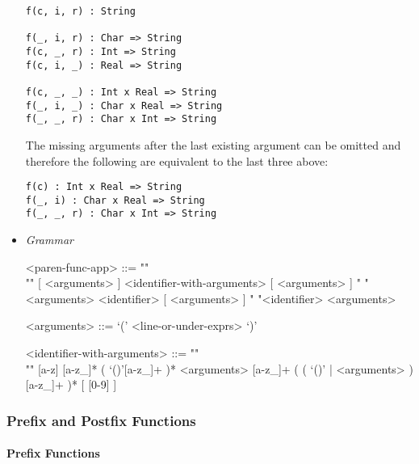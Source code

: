 \documentclass{article}
\begin{document}
\begin{itemize}
\begin{verbatim}
f(c, i, r) : String

f(_, i, r) : Char => String
f(c, _, r) : Int => String
f(c, i, _) : Real => String

f(c, _, _) : Int x Real => String
f(_, i, _) : Char x Real => String
f(_, _, r) : Char x Int => String
\end{verbatim}

The missing arguments after the last existing argument can be omitted and therefore
the following are equivalent to the last three above:

\begin{verbatim}
f(c) : Int x Real => String
f(_, i) : Char x Real => String
f(_, _, r) : Char x Int => String
\end{verbatim}

\item \textit{Grammar}
\begin{grammar}
<paren-func-app> ::= ""\\""
[ <arguments> ] <identifier-with-arguments> [ <arguments> ]
\alt " "<arguments> <identifier> [ <arguments> ]
\alt " "<identifier> <arguments>

<arguments> ::= `(' <line-or-under-exprs> `)'

<identifier-with-arguments> ::= ""\\""
[a-z] [a-z_]* ( `()'[a-z_]+ )* <arguments>
[a-z_]+ ( ( `()' | <arguments> ) [a-z_]+ )* 
[ [0-9] ]
\end{grammar}

\end{itemize}

\subsubsection{Prefix and Postfix Functions}
 
\paragraph{Prefix Functions}
\end{document}
